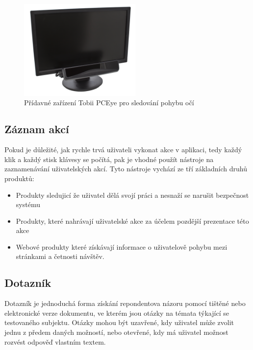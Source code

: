 \begin{figure}[htb]
\begin{center}
\includegraphics[width=60mm]{./pictures/tobii_image_pceye_mounted_front_rgb.jpg}
\caption{Přídavné zařízení Tobii PCEye pro sledování pohybu očí}
\label{fig:tobii}
\end{center}
\end{figure}

\subsection{Záznam akcí}
Pokud je důležité, jak rychle trvá uživateli vykonat akce v aplikaci, tedy každý klik a každý stisk klávesy se počítá, pak je vhodné použít nástroje na zaznamenávání uživatelských akcí\cite{stone2005user}. Tyto nástroje vychází ze tří základních druhů produktů\cite{stone2005user}:
\begin{itemize}
\item Produkty sledujicí že uživatel dělá svojí práci a nesnaží se narušit bezpečnost systému
\item Produkty, které nahrávají uživatelské akce za účelem pozdější prezentace této akce
\item Webové produkty které získávají informace o uživatelově pohybu mezi stránkami a četnosti návštěv.
\end{itemize}

\subsection{Dotazník}
Dotazník je jednoduchá forma získání repondentova názoru pomocí tištěné nebo elektronické verze dokumentu, ve kterém jsou otázky na témata týkající se testovaného subjektu. Otázky mohou být uzavřené, kdy uživatel může zvolit jednu z předem daných možností, nebo otevřené, kdy má uživatel možnost rozvést odpověď vlastním textem.


